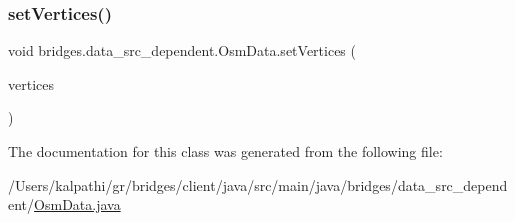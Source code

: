 \subsubsection{\texorpdfstring{set\+Vertices()}{setVertices()}}
{\footnotesize\ttfamily void bridges.\+data\+\_\+src\+\_\+dependent.\+Osm\+Data.\+set\+Vertices (\begin{DoxyParamCaption}\item[{\mbox{\hyperlink{classbridges_1_1data__src__dependent_1_1_osm_vertex}{Osm\+Vertex}} \mbox{[}$\,$\mbox{]}}]{vertices }\end{DoxyParamCaption})}



The documentation for this class was generated from the following file\+:\begin{DoxyCompactItemize}
\item 
/\+Users/kalpathi/gr/bridges/client/java/src/main/java/bridges/data\+\_\+src\+\_\+dependent/\mbox{\hyperlink{_osm_data_8java}{Osm\+Data.\+java}}\end{DoxyCompactItemize}
